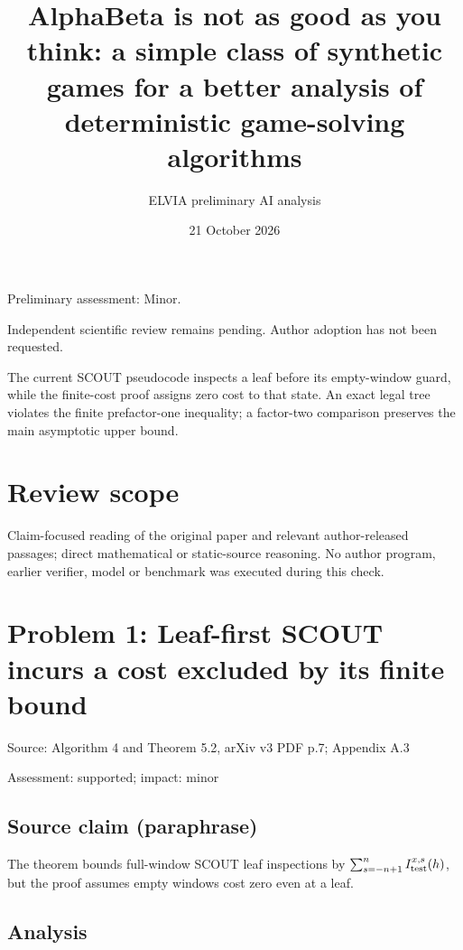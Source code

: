 \documentclass[11pt]{article}
\begin{document}
\title{AlphaBeta is not as good as you think: a simple class of synthetic games for a better analysis of deterministic game-solving algorithms}

\author{ELVIA preliminary AI analysis}\date{21 October 2026}\maketitle

Preliminary assessment: Minor.\par

Independent scientific review remains pending. Author adoption has not been requested.

The current SCOUT pseudocode inspects a leaf before its empty-window guard, while the finite-cost proof assigns zero cost to that state. An exact legal tree violates the finite prefactor-one inequality; a factor-two comparison preserves the main asymptotic upper bound.

\section*{Review scope}

Claim-focused reading of the original paper and relevant author-released passages; direct mathematical or static-source reasoning. No author program, earlier verifier, model or benchmark was executed during this check.

\section*{Problem 1: Leaf-first SCOUT incurs a cost excluded by its finite bound}

Source: Algorithm 4 and Theorem 5.2, arXiv v3 PDF p.7; Appendix A.3

Assessment: supported; impact: minor

\subsection*{Source claim (paraphrase)}

The theorem bounds full-window SCOUT leaf inspections by \(\sum_{s=-n+1}^n I_{\rm test}^{x,s}(h)\), but the proof assumes empty windows cost zero even at a leaf.

\subsection*{Analysis}
\end{document}
